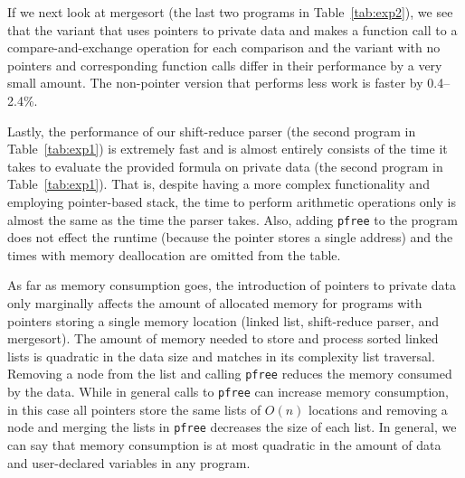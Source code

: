 \documentclass[11pt]{article}
\begin{document}
If we next look at mergesort (the last two programs in
Table~\ref{tab:exp2}), we see that the variant that uses pointers to private
data and makes a function call to a compare-and-exchange operation for each
comparison and the variant with no pointers and corresponding function calls
differ in their performance by a very small amount. The non-pointer version
that performs less work is faster by 0.4--2.4\%.

Lastly, the performance of our shift-reduce parser (the second program in
Table~\ref{tab:exp1}) is extremely fast and is almost entirely consists of
the time it takes to evaluate the provided formula on private data (the
second program in Table~\ref{tab:exp1}). That is, despite having a more
complex functionality and employing pointer-based stack, the time to perform
arithmetic operations only is almost the same as the time the parser takes.
Also, adding \texttt{pfree} to the program does not effect the runtime
(because the pointer stores a single address) and the times with
memory deallocation are omitted from the table. 

As far as memory consumption goes, the introduction of pointers to private
data only marginally affects the amount of allocated memory for programs
with pointers storing a single memory location (linked list, shift-reduce
parser, and mergesort). The amount of memory needed to store and process
sorted linked lists is quadratic in the data size and matches in its
complexity list traversal. Removing a node from the list and calling
\texttt{pfree} reduces the memory consumed by the data. While in general
calls to \texttt{pfree} can increase memory consumption, in this case all
pointers store the same lists of $O(n)$ locations and removing a node and
merging the lists in \texttt{pfree} decreases the size of each list. In
general, we can say that memory consumption is at most quadratic in the
amount of data and user-declared variables in any program.
\end{document}
